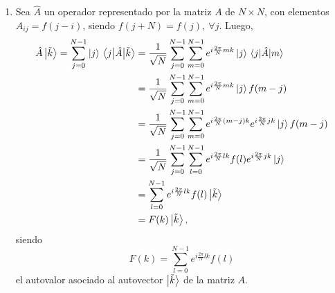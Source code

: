 \documentclass{scrartcl}
\newcommand{\inv}[1]{\frac{1}{#1}}
\DeclareRobustCommand{\[}{\begin{equation}}
\DeclareRobustCommand{\]}{\end{equation}}
\begin{document}
\begin{enumerate}
    \item Sea $\hat{A}$ un operador representado por la matriz $A$ de $N \times N$, con elementos $A_{ij} = f(j - i)$, siendo $f(j + N) = f(j), \ \forall j$. Luego,
    \begin{align}
        \hat{A} \ket{\tilde{k}} = \sum_{j = 0}^{N - 1} \ket{j} \mel{j}{\hat A}{\tilde{k}} &= \inv{\sqrt{N}} \sum_{j = 0}^{N - 1} \sum_{m = 0}^{N - 1} e^{i \frac{2\pi}{N} mk} \ket{j} \mel{j}{\hat A}{m} \\
            &= \inv{\sqrt{N}} \sum_{j = 0}^{N - 1} \sum_{m = 0}^{N - 1} e^{i \frac{2\pi}{N} mk} \ket{j} f(m - j) \\
            &= \inv{\sqrt{N}} \sum_{j = 0}^{N - 1} \sum_{m = 0}^{N - 1} e^{i \frac{2\pi}{N} (m - j) k} e^{i \frac{2\pi}{N} jk} \ket{j} f(m - j) \\
            &= \inv{\sqrt{N}} \sum_{j = 0}^{N - 1} \sum_{l = 0}^{N - 1} e^{i \frac{2\pi}{N} lk} f(l) e^{i \frac{2\pi}{N} jk} \ket{j} \\
            &= \sum_{l = 0}^{N - 1} e^{i \frac{2\pi}{N} lk} f(l) \ket{\tilde{k}} \\
            &= F(k) \ket{\tilde{k}}, \\
    \end{align}
    siendo
    \[ F(k) = \sum_{l = 0}^{N - 1} e^{i \frac{2\pi}{N} lk} f(l) \]
    el autovalor asociado al autovector $\ket{\tilde{k}}$ de la matriz $A$.
    
\end{enumerate}

\end{document}
